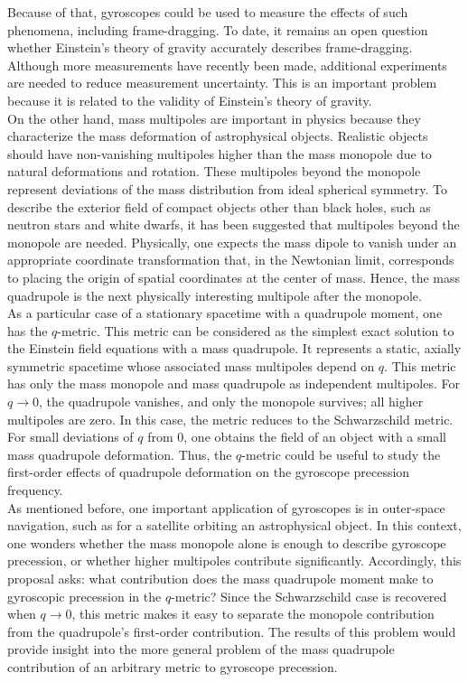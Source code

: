 \documentclass[12pt]{article}
\begin{document}
Because of that, gyroscopes could be used to measure the effects of such phenomena, including frame-dragging. To date, it remains an open question whether Einstein’s theory of gravity accurately describes frame-dragging. Although more measurements have recently been made, additional experiments are needed to reduce measurement uncertainty. This is an important problem because it is related to the validity of Einstein’s theory of gravity. \\

On the other hand, mass multipoles are important in physics because they characterize the mass deformation of astrophysical objects. Realistic objects should have non-vanishing multipoles higher than the mass monopole due to natural deformations and rotation. These multipoles beyond the monopole represent deviations of the mass distribution from ideal spherical symmetry. To describe the exterior field of compact objects other than black holes, such as neutron stars and white dwarfs, it has been suggested that multipoles beyond the monopole are needed. Physically, one expects the mass dipole to vanish under an appropriate coordinate transformation that, in the Newtonian limit, corresponds to placing the origin of spatial coordinates at the center of mass. Hence, the mass quadrupole is the next physically interesting multipole after the monopole. \\

As a particular case of a stationary spacetime with a quadrupole moment, one has the $q$-metric. This metric can be considered as the simplest exact solution to the Einstein field equations with a mass quadrupole. It represents a static, axially symmetric spacetime whose associated mass multipoles depend on $q$. This metric has only the mass monopole and mass quadrupole as independent multipoles. For $q\to 0$, the quadrupole vanishes, and only the monopole survives; all higher multipoles are zero. In this case, the metric reduces to the Schwarzschild metric. For small deviations of $q$ from $0$, one obtains the field of an object with a small mass quadrupole deformation. Thus, the $q$-metric could be useful to study the first-order effects of quadrupole deformation on the gyroscope precession frequency. \\

As mentioned before, one important application of gyroscopes is in outer-space navigation, such as for a satellite orbiting an astrophysical object. In this context, one wonders whether the mass monopole alone is enough to describe gyroscope precession, or whether higher multipoles contribute significantly. Accordingly, this proposal asks: what contribution does the mass quadrupole moment make to gyroscopic precession in the $q$-metric? Since the Schwarzschild case is recovered when $ q\to 0$, this metric makes it easy to separate the monopole contribution from the quadrupole's first-order contribution. The results of this problem would provide insight into the more general problem of the mass quadrupole contribution of an arbitrary metric to gyroscope precession.\\
\end{document}

